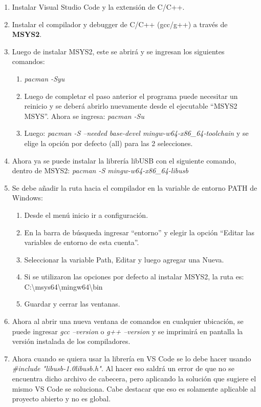 \documentclass[a4paper,12pt]{report} %
\begin{document}
\begin{enumerate}
	\item Instalar Visual Studio Code y la extensión de C/C++.
	\item Instalar el compilador y debugger de C/C++ (gcc/g++) a través de \textbf{MSYS2}.
	\item Luego de instalar MSYS2, este se abrirá y se ingresan los siguientes comandos:
	\begin{enumerate}
		\item \textit{pacman -Syu}
		\item Luego de completar el paso anterior el programa puede necesitar un reinicio y se deberá abrirlo nuevamente desde el ejecutable ``MSYS2 MSYS''. Ahora se ingresa: \textit{pacman -Su}
		\item Luego: \textit{pacman -S --needed base-devel mingw-w64-x86\_64-toolchain} y se elige la opción por defecto (all) para las 2 selecciones.
	\end{enumerate}
	\item Ahora ya se puede instalar la librería libUSB con el siguiente comando, dentro de MSYS2: \textit{pacman -S mingw-w64-x86\_64-libusb}
	\item Se debe añadir la ruta hacia el compilador en la variable de entorno PATH de Windows:
	\begin{enumerate}
		\item Desde el menú inicio ir a configuración.
		\item En la barra de búsqueda ingresar ``entorno'' y elegir la opción ``Editar las variables de entorno de esta cuenta''.
		\item Seleccionar la variable Path, Editar y luego agregar una Nueva.
		\item Si se utilizaron las opciones por defecto al instalar MSYS2, la ruta es: C:\textbackslash msys64\textbackslash mingw64\textbackslash bin
		\item Guardar y cerrar las ventanas.
	\end{enumerate}
	\item Ahora al abrir una nueva ventana de comandos en cualquier ubicación, se puede ingresar \textit{gcc --version} o \textit{g++ --version} y se imprimirá en pantalla la versión instalada de los compiladores.
	\item Ahora cuando se quiera usar la librería en VS Code se lo debe hacer usando \textit{\#include "libusb-1.0\/libusb.h"}. Al hacer eso saldrá un error de que no se encuentra dicho archivo de cabecera, pero aplicando la solución que sugiere el mismo VS Code se soluciona. Cabe destacar que eso es solamente aplicable al proyecto abierto y no es global.
\end{enumerate}
\end{document}
